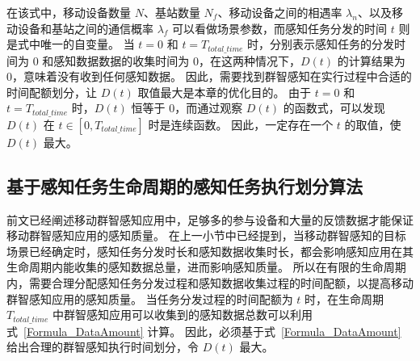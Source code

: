 在该式中，移动设备数量 $N$、基站数量 $N_f$、移动设备之间的相遇率 $\lambda_n$、以及移动设备和基站之间的通信概率 $\lambda_f$ 可以看做场景参数，而感知任务分发的时间 $t$ 则是式中唯一的自变量。
当 $t = 0$ 和 $t = T_{total\_time}$ 时，分别表示感知任务的分发时间为 0 和感知数据数据的收集时间为 0，在这两种情况下，$D(t)$ 的计算结果为0，意味着没有收到任何感知数据。
因此，需要找到群智感知在实行过程中合适的时间配额划分，让 $D(t)$ 取值最大是本章的优化目的。
由于 $t = 0$ 和 $t = T_{total\_time}$ 时，$D(t)$ 恒等于 $0$，而通过观察 $D(t)$ 的函数式，可以发现 $D(t)$ 在 $ t \in [0, T_{total\_time}] $ 时是连续函数。
因此，一定存在一个 $t$ 的取值，使 $D(t)$ 最大。

\subsection{基于感知任务生命周期的感知任务执行划分算法}
\label{UIC:algo}


前文已经阐述移动群智感知应用中，足够多的参与设备和大量的反馈数据才能保证移动群智感知应用的感知质量。
在上一小节中已经提到，当移动群智感知的目标场景已经确定时，感知任务分发时长和感知数据收集时长，都会影响感知应用在其生命周期内能收集的感知数据总量，进而影响感知质量。
所以在有限的生命周期内，需要合理分配感知任务分发过程和感知数据收集过程的时间配额，以提高移动群智感知应用的感知质量。
当任务分发过程的时间配额为 $t$ 时，在生命周期 $T_{total\_time}$ 中群智感知应用可以收集到的感知数据总数可以利用式~\eqref{Formula_DataAmount} 计算。
因此，必须基于式~\eqref{Formula_DataAmount} 给出合理的群智感知执行时间划分，令 $D(t)$ 最大。


